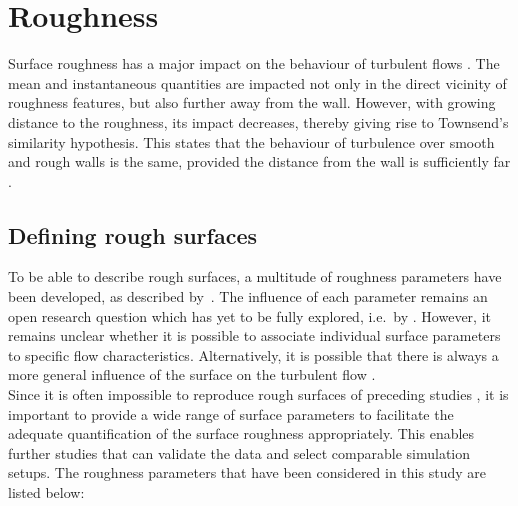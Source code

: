 \section{Roughness}\label{sec: Roughness}
Surface roughness has a major impact on the behaviour of turbulent flows \citep{chungPredictingDragRough2021}.
 The mean and instantaneous quantities are impacted not only in the direct vicinity of roughness features, but also further away from the wall.
However, with growing distance to the roughness, its impact decreases, thereby giving rise to Townsend's similarity hypothesis.
This states that the behaviour of turbulence over smooth and rough walls is the same, provided the distance from the wall is sufficiently far \citep{chungPredictingDragRough2021}.

\subsection{Defining rough surfaces}\label{subsec: defining rough surfaces}
To be able to describe rough surfaces, a multitude of roughness parameters have been developed, as described by~\cite{chungPredictingDragRough2021}.
The influence of each parameter remains an open research question which has yet to be fully explored, i.e.\ by \citep{flackReviewHydraulicRoughness2010,jellyReynoldsDispersiveShear2018}.
However, it remains unclear whether it is possible to associate individual surface parameters to specific flow characteristics. Alternatively, it is possible that there is always a more general influence of the surface on the turbulent flow \citep{chungPredictingDragRough2021}.\\
Since it is often impossible to reproduce rough surfaces of  preceding studies \citep{chungPredictingDragRough2021}, it is important to provide a wide range of surface parameters to  facilitate the adequate quantification of the surface roughness appropriately.
This enables further studies that can validate the data and select comparable simulation setups.
The roughness parameters that have been considered in this study are listed below:

